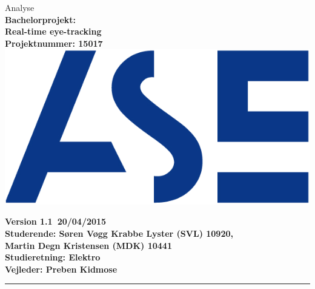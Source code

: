 \documentclass[a4paper,oneside,12pt]{article}
\begin{document}
	\begin{titlepage}
		\centering
		\vfill
		{\LARGE Analyse}\\
		\vfill
		{\bfseries\large
			Bachelorprojekt: \\
			Real-time eye-tracking\\
			Projektnummer: 15017\\
		}
		\vfill
		\includegraphics{ASE_logo.png}
		\vfill
		{\bfseries\large
			Version 1.1\
			20/04/2015\\
			Studerende: Søren Vøgg Krabbe Lyster (SVL) 10920,\\
			Martin Degn Kristensen (MDK) 10441\\ 
			Studieretning: Elektro \\
			Vejleder: Preben Kidmose \\
			\vfill	
			\rule{6cm}{1pt}
		}

	\end{titlepage}
	\begin{versionhistory}
	\end{versionhistory}
\end{document}
